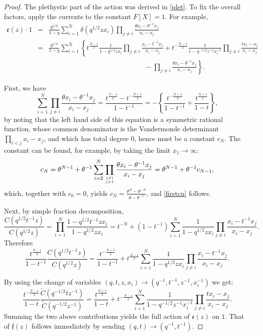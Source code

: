 \begin{proof}
The plethystic part of the action was derived in \eqref{plet}. To fix the overall factors, apply the
currents to the constant $F[X]=1$. For example,
\begin{eqnarray*}
{\mathfrak e}(z)\cdot 1&=& \frac{q^{1/2}}{1-q} \sum_{i=1}^N \delta(q^{1/2}z x_i) \prod_{j\neq i} \frac{\theta x_i -\theta^{-1} x_j}{x_i-x_j}\\
&=&\frac{q^{1/2}}{1-q}\sum_{i=1}^N \left\{ t^{\frac{N-1}{2}} \frac{1}{1-q^{1/2}z x_i} \prod_{j\neq i} \frac{ x_i -t^{-1} x_j}{x_i-x_j}
+t^{-\frac{N-1}{2}} \frac{1}{1-q^{-1/2}z^{-1} x_i^{-1}} \prod_{j\neq i} \frac{ t x_i -x_j}{x_i-x_j}\right. \\
&&\qquad \qquad \qquad \qquad \qquad \qquad \qquad -\left.
\prod_{j\neq i} \frac{\theta x_i -\theta^{-1} x_j}{x_i-x_j}\right\}.
\end{eqnarray*}

First, we have
\begin{equation}\label{firstcn}
\sum_{i=1}^N\prod_{j\neq i} \frac{\theta x_i -\theta^{-1} x_j}{x_i-x_j} =\frac{t^{\frac{N-1}{2}}-t^{-\frac{N+1}{2}}}{1-t^{-1}}
=-\left\{  \frac{t^{-\frac{N+1}{2}}}{1-t^{-1}}+ \frac{t^{\frac{N+1}{2}}}{1-t}\right\},
\end{equation}
by noting that the left hand side of this equation is a symmetric rational function, whose common denominator is the Vandermonde determinant
$\prod_{i<j}x_i-x_j$, and which has
total degree $0$, hence must be a constant $c_N$. The constant can be found, for example, by taking the limit $x_1\to\infty$:
$$c_N=\theta^{N-1}+\theta^{-1} \sum_{i=2}^{N} \prod_{j\neq i\atop j>1} \frac{\theta x_i -\theta^{-1} x_j}{x_i-x_j}=
\theta^{N-1}+\theta^{-1} c_{N-1} ,$$
which, together with $c_0=0$, yields $c_N=\frac{\theta^N-\theta^{-N}}{\theta-\theta^{-1}}$, and \eqref{firstcn} follows.

Next, by simple fraction decomposition,
$$\frac{C(q^{1/2}t^{-1}z)}{C(q^{1/2}z)} =\prod_{i=1}^N \frac{1-q^{1/2}t^{-1}zx_i}{1-q^{1/2}zx_i}=t^{-N}+(1-t^{-1}) 
\sum_{i=1}^N \frac{1}{1-q^{1/2}z x_i} \prod_{j\neq i} \frac{ x_i -t^{-1} x_j}{x_i-x_j}.$$
Therefore
$$\frac{t^{\frac{N-1}{2}}}{1-t^{-1}} \frac{C(q^{1/2}t^{-1}z)}{C(q^{1/2}z)}=
\frac{t^{-\frac{N+1}{2}}}{1-t^{-1}}+t^{\frac{N-1}{2}}
\sum_{i=1}^N \frac{1}{1-q^{1/2}z x_i} \prod_{j\neq i} \frac{ x_i -t^{-1} x_j}{x_i-x_j}.$$

By using the change of variables $(q,t,z,x_i)\to (q^{-1},t^{-1},z^{-1},x_i^{-1})$ we get:
$$\frac{t^{-\frac{N-1}{2}}}{1-t} \frac{{\widetilde C}(q^{-1/2}tz^{-1})}{{\widetilde C}(q^{-1/2}z^{-1})}=
\frac{t^{\frac{N+1}{2}}}{1-t}+t^{-\frac{N-1}{2}}\sum_{i=1}^N\frac{1}{1-q^{-1/2}z^{-1} x_i^{-1}} 
\prod_{j\neq i} \frac{ t x_i -x_j}{x_i-x_j}.$$
Summing the two above contributions yields the full action of ${\mathfrak e}(z)$ on $1$. 
That of ${\mathfrak f}(z)$
follows immediately by sending $(q,t)\to (q^{-1},t^{-1})$.
\end{proof}

